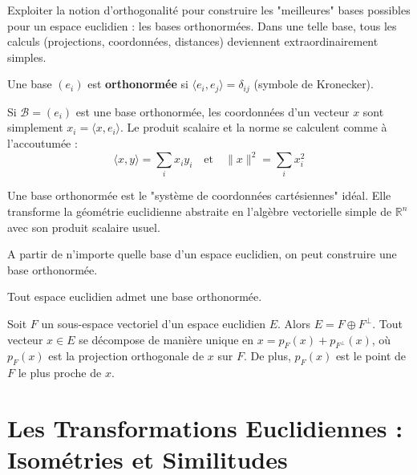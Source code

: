 \begin{objectif}
    Exploiter la notion d'orthogonalité pour construire les "meilleures" bases possibles pour un espace euclidien : les bases orthonormées. Dans une telle base, tous les calculs (projections, coordonnées, distances) deviennent extraordinairement simples.
\end{objectif}

\begin{definition}
    Une base $(e_i)$ est \textbf{orthonormée} si $\langle e_i, e_j \rangle = \delta_{ij}$ (symbole de Kronecker).
\end{definition}

\begin{proposition}
    Si $\mathcal{B}=(e_i)$ est une base orthonormée, les coordonnées d'un vecteur $x$ sont simplement $x_i = \langle x, e_i \rangle$. Le produit scalaire et la norme se calculent comme à l'accoutumée :
    $$ \langle x, y \rangle = \sum_i x_i y_i \quad \text{et} \quad \|x\|^2 = \sum_i x_i^2 $$
\end{proposition}
\begin{remark}
    Une base orthonormée est le "système de coordonnées cartésiennes" idéal. Elle transforme la géométrie euclidienne abstraite en l'algèbre vectorielle simple de $\mathbb{R}^n$ avec son produit scalaire usuel.
\end{remark}

\begin{theorem}
    A partir de n'importe quelle base d'un espace euclidien, on peut construire une base orthonormée.
\end{theorem}

\begin{corollary}
    Tout espace euclidien admet une base orthonormée.
\end{corollary}

\begin{theorem}
    Soit $F$ un sous-espace vectoriel d'un espace euclidien $E$. Alors $E = F \oplus F^\perp$. Tout vecteur $x \in E$ se décompose de manière unique en $x = p_F(x) + p_{F^\perp}(x)$, où $p_F(x)$ est la projection orthogonale de $x$ sur $F$. De plus, $p_F(x)$ est le point de $F$ le plus proche de $x$.
\end{theorem}

\section{Les Transformations Euclidiennes : Isométries et Similitudes}

